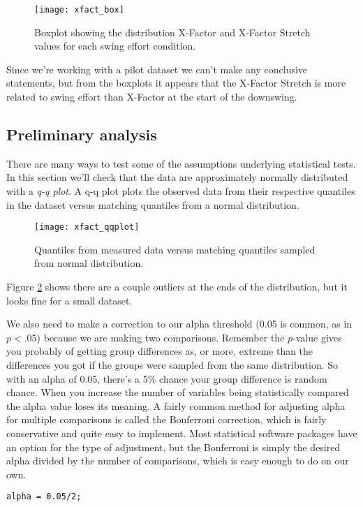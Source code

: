 \documentclass[12pt,a4paper]{article}
\begin{document}
\begin{figure}[H]
\centering
\texttt{[image: xfact\_box]}
\caption{Boxplot showing the distribution X-Factor and X-Factor Stretch values for each swing effort condition.}
\label{fig:box}
\end{figure}

Since we're working with a pilot dataset we can't make any conclusive statements, but from the boxplots it appears that the X-Factor Stretch is more related to swing effort than X-Factor at the start of the downswing.

\subsection{Preliminary analysis}
There are many ways to test some of the assumptions underlying statistical tests.
In this section we'll check that the data are approximately normally distributed with a \emph{q-q plot}.
A q-q plot plots the observed data from their respective quantiles in the dataset versus matching quantiles from a normal distribution.

\begin{figure}
\centering
\texttt{[image: xfact\_qqplot]}
\caption{Quantiles from measured data versus matching quantiles sampled from normal distribution.}
\label{fig:qqplot}
\end{figure}

Figure \ref{fig:qqplot} shows there are a couple outliers at the ends of the distribution, but it looks fine for a small dataset.

We also need to make a correction to our alpha threshold (0.05 is common, as in $p<.05$) because we are making two comparisons.
Remember the $p$-value gives you probably of getting group differences as, or more, extreme than the differences you got if the groups were sampled from the same distribution.
So with an alpha of 0.05, there's a 5\% chance your group difference is random chance.
When you increase the number of variables being statistically compared the alpha value loses its meaning.
A fairly common method for adjusting alpha for multiple comparisons is called the Bonferroni correction, which is fairly conservative and quite easy to implement. 
Most statistical software packages have an option for the type of adjustment, but the Bonferroni is simply the desired alpha divided by the number of comparisons, which is easy enough to do on our own.
\begin{lstlisting}[style=Matlab-editor]
% Since we have two comparisons, adjust alpha to 0.05/2
alpha = 0.05/2;
\end{lstlisting}
\end{document}
